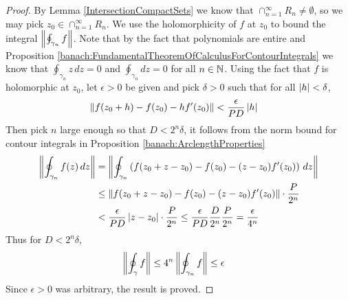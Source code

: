 \begin{proof}
By Lemma \ref{IntersectionCompactSets} we know that $\cap_{n=1}^\infty R_n \neq \emptyset$, so we may pick $z_0 \in \cap_{n=1}^\infty R_n$.  
We use the holomorphicity of $f$ at $z_0$ to bound the integral $\left \lVert \oint_{\gamma_n} f \right \rVert$.   
Note that by the fact that polynomials are entire and Proposition \ref{banach:FundamentalTheoremOfCalculusForContourIntegrals} 
we know that $\oint_{\gamma_n} z \, dz=0$ and $\oint_{\gamma_n}dz = 0$ for all $n \in \mathbb{N}$.   
Using the fact that $f$ is holomorphic at $z_0$, let  $\epsilon > 0$ be given and pick $\delta >0$ such that for all $\left \vert h \right \vert < \delta$,
\begin{align*}
\left \lVert f(z_0+h) - f(z_0) - h f^\prime(z_0) \right \rVert &< \frac{\epsilon}{PD} \left \vert h \right \vert
\end{align*}
Then pick $n$ large enough so that $D < 2^n \delta$, it follows from the norm bound for contour integrals in Proposition \ref{banach:ArclengthProperties}
\begin{align*}
\left \lVert \oint_{\gamma_n} f(z) \, dz \right \rVert &= \left \lVert \oint_{\gamma_n}\left( f(z_0+z - z_0) - f(z_0) - (z - z_0) f^\prime(z_0)\right) \, dz  \right \rVert\\
&\leq \left \lVert f(z_0+z - z_0) - f(z_0) - (z - z_0) f^\prime(z_0) \right \rVert \cdot \frac{P}{2^n}  \\
&< \frac{\epsilon}{PD} \left \vert z - z_0 \right \vert \cdot \frac{P}{2^n}  \leq \frac{\epsilon}{PD} \frac{D}{2^n} \frac{P}{2^n} = \frac{\epsilon}{4^n} \\
\end{align*}
Thus for $D < 2^n \delta$,
\begin{align*}
\left \lVert \oint_{\gamma} f \right \rVert &\leq 4^n \left \lVert \oint_{\gamma_n} f \right \rVert \leq \epsilon 
\end{align*}
Since $\epsilon>0$ was arbitrary, the result is proved.
\end{proof}


